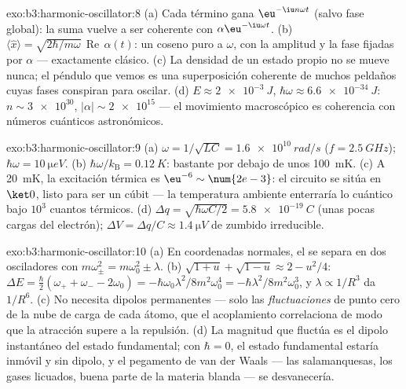 \begin{solution}{exo:b3:harmonic-oscillator:8}
(a) Cada término gana $\eu^{-\iu n\omega t}$ (salvo fase global):
la suma vuelve a ser coherente con $\alpha\eu^{-\iu\omega t}$. (b)
$\langle\hat x\rangle = \sqrt{2\hbar/m\omega}\,
\operatorname{Re}\,\alpha(t)$: un coseno puro a $\omega$, con la amplitud
y la fase fijadas por $\alpha$ --- exactamente clásico. (c) La densidad de
un estado propio no se mueve nunca; el péndulo que vemos es una
superposición coherente de muchos peldaños cuyas fases conspiran para
oscilar. (d) $E
\approx \qty{2e-3}{J}$, $\hbar\omega \approx \qty{6.6e-34}{J}$: $n
\sim \num{3e30}$, $|\alpha| \sim \num{2e15}$ --- el movimiento macroscópico
es coherencia con números cuánticos astronómicos.
\end{solution}

\begin{solution}{exo:b3:harmonic-oscillator:9}
(a) $\omega = 1/\sqrt{LC} = \qty{1.6e10}{rad/s}$ ($f =
\qty{2.5}{GHz}$); $\hbar\omega = \qty{10}{\micro eV}$. (b)
$\hbar\omega/k_{\text{B}} = \qty{0.12}{K}$: bastante por debajo de unos
\qty{100}{mK}. (c) A \qty{20}{mK}, la excitación térmica es
$\eu^{-6} \sim \num{2e-3}$: el circuito se sitúa en $\ket0$, listo para
ser un cúbit --- la temperatura ambiente enterraría lo cuántico bajo $10^3$
cuantos térmicos. (d) $\Delta q = \sqrt{\hbar\omega C/2} =
\qty{5.8e-19}{C}$ (unas pocas cargas del electrón); $\Delta V = \Delta q/C
\approx \qty{1.4}{\micro V}$ de zumbido irreducible.
\end{solution}

\begin{solution}{exo:b3:harmonic-oscillator:10}
(a) En coordenadas normales, el  se separa en dos
osciladores con $m\omega_\pm^2 = m\omega_0^2 \pm \lambda$. (b)
$\sqrt{1 + u} + \sqrt{1 - u} \approx 2 - u^2/4$: $\Delta E =
\tfrac\hbar2(\omega_+ + \omega_- - 2\omega_0) =
-\hbar\omega_0\lambda^2/8m^2\omega_0^4 =
-\hbar\lambda^2/8m^2\omega_0^3$, y $\lambda \propto 1/R^3$ da
$1/R^6$. (c) No necesita dipolos permanentes --- solo las
\emph{fluctuaciones} de punto cero de la nube de carga de cada átomo, que
el acoplamiento correlaciona de modo que la atracción supere a la
repulsión. (d) La magnitud que fluctúa es el dipolo instantáneo del estado
fundamental; con $\hbar = 0$, el estado fundamental estaría inmóvil y sin
dipolo, y el pegamento de van der Waals --- las salamanquesas, los gases
licuados, buena parte de la materia blanda --- se desvanecería.
\end{solution}


